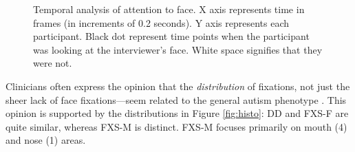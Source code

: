 \documentclass{llncs}
\begin{document}
 \begin{figure}[t]
     \hfill
     \hfill
     \centering
  
     \caption{Temporal analysis of attention to face. X axis represents time in frames (in increments of 0.2 seconds). Y axis represents each participant. Black dot represent time points when the participant was looking at the interviewer's face. White space signifies that they were not.}
    \label{fig:sticky}
   \end{figure}
Clinicians often express the opinion that the \emph{distribution} of fixations, not just the sheer lack of face fixations---seem related to the general autism phenotype \cite{klin2002,jones2013}. This opinion is supported by the distributions in Figure \ref{fig:histo}: DD and FXS-F are quite similar, whereas FXS-M is distinct. FXS-M focuses primarily on mouth (4) and nose (1) areas.
  
\end{document}
